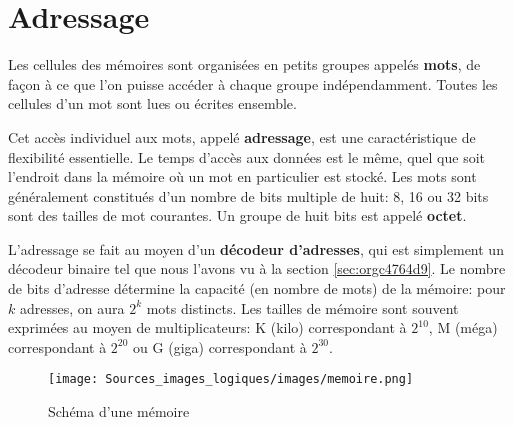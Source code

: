 \documentclass[letter, oneside]{book}
\begin{document}
\section{Adressage}
\label{sec:org0db86b5}

Les cellules des mémoires sont organisées en petits groupes appelés
\textbf{mots}, de façon à ce que l'on puisse accéder à chaque groupe
indépendamment. Toutes les cellules d'un mot sont lues ou écrites
ensemble.

Cet accès individuel aux mots, appelé \textbf{adressage}, est une
caractéristique de flexibilité essentielle. Le temps d'accès aux
données est le même, quel que soit l'endroit dans la mémoire où un mot
en particulier est stocké. Les mots sont généralement constitués d'un
nombre de bits multiple de huit: 8, 16 ou 32 bits sont des tailles de
mot courantes. Un groupe de huit bits est appelé \textbf{octet}.

L'adressage se fait au moyen d'un \textbf{décodeur d'adresses}, qui est
simplement un décodeur binaire tel que nous l'avons vu à la section
\ref{sec:orgc4764d9}. Le nombre de bits d'adresse détermine la capacité (en nombre
de mots) de la mémoire: pour \(k\) adresses, on aura \(2^k\) mots
distincts. Les tailles de mémoire sont souvent exprimées au moyen de
multiplicateurs: K (kilo) correspondant à \(2^{10}\), M (méga)
correspondant à \(2^{20}\) ou G (giga) correspondant à \(2^{30}\).


\begin{figure}[htbp]
\centering
\texttt{[image: Sources\_images\_logiques/images/memoire.png]}
\caption{\label{fig:org6218de9}Schéma d'une mémoire}
\end{figure}
\end{document}
